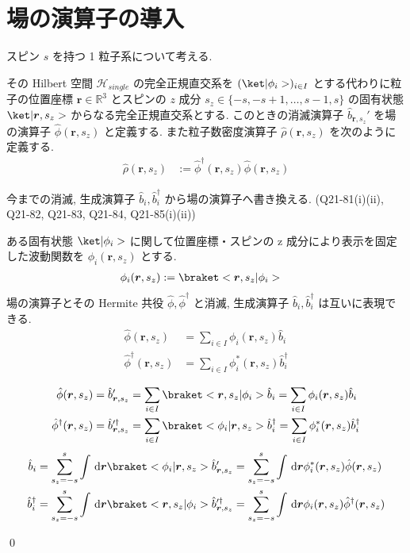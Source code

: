 \documentclass[uplatex,dvipdfmx,a4paper,11pt]{jlreq}
\makeatletter
\newcommand{\RR}{\mathbb{R}}
\newcommand{\HH}{\mathcal{H}}
\newcommand{\rr}{\bm{r}}
\numberwithin{equation}{section}
\theoremstyle{definition}
\renewenvironment{proof}[1][\proofname]{\par
  \normalfont
  \topsep6\p@\@plus6\p@ \trivlist
  \item[\hskip\labelsep{\bfseries #1}\@addpunct{\bfseries}]\ignorespaces\quad\par
}{
  \qed\endtrivlist\@endpefalse
}
\renewcommand\proofname{証明}
\makeatother
\begin{document}
\section{場の演算子の導入}
\begin{definition}[場の演算子]
  スピン $s$ を持つ 1 粒子系について考える.

  その Hilbert 空間 $\HH_{single}$ の完全正規直交系を $(\ket|\phi_i>)_{i\in I}$ とする代わりに粒子の位置座標 $\rr\in\RR^3$ とスピンの $z$ 成分 $s_z\in\{-s,-s+1,\ldots,s-1,s\}$ の固有状態 $\ket|\rr, s_z>$ からなる完全正規直交系とする.
  このときの消滅演算子 $\hat{b}_{\rr,s_z}'$ を場の演算子 $\hat{\phi}(\rr, s_z)$ と定義する.
  また粒子数密度演算子 $\hat{\rho}(\rr, s_z)$ を次のように定義する.
  \begin{align}
    \hat{\rho}(\rr, s_z) & := \hat{\phi}^\dagger(\rr, s_z)\hat{\phi}(\rr, s_z)
  \end{align}
\end{definition}
今までの消滅, 生成演算子 $\hat{b}_i, \hat{b}_i^\dagger$ から場の演算子へ書き換える. (Q21-81(i)(ii), Q21-82, Q21-83, Q21-84, Q21-85(i)(ii))
\begin{theorem}
  ある固有状態 $\ket|\phi_i>$ に関して位置座標・スピンの z 成分により表示を固定した波動関数を $\phi_i(\rr, s_z)$ とする.
  \begin{align}
    \phi_i(\rr, s_z) & := \braket<\rr, s_z|\phi_i>
  \end{align}
  場の演算子とその Hermite 共役 $\hat{\phi}, \hat{\phi}^\dagger$ と消滅, 生成演算子 $\hat{b}_i, \hat{b}_i^\dagger$ は互いに表現できる.
  \begin{align}
    \hat{\phi}(\rr, s_z)         & = \sum_{i\in I}\phi_i(\rr, s_z)\hat{b}_i           \\
    \hat{\phi}^\dagger(\rr, s_z) & = \sum_{i\in I}\phi_i^*(\rr, s_z)\hat{b}_i^\dagger
  \end{align}
\end{theorem}
\begin{proof}
  \begin{align}
    \hat{\phi}(\rr, s_z)         & = \hat{b}_{\rr,s_z}' = \sum_{i\in I}\braket<\rr,s_z|\phi_i>\hat{b}_i = \sum_{i\in I}\phi_i(\rr, s_z)\hat{b}_i                                  \\
    \hat{\phi}^\dagger(\rr, s_z) & = \hat{b}_{\rr,s_z}^{\prime\dagger} = \sum_{i\in I}\braket<\phi_i|\rr,s_z>\hat{b}_i^\dagger = \sum_{i\in I}\phi_i^*(\rr, s_z)\hat{b}_i^\dagger
  \end{align}
  \begin{align}
    \hat{b}_i         & = \sum_{s_z = -s}^s\int\dl{\rr}\braket<\phi_i|\rr, s_z>\hat{b}_{\rr,s_z}' = \sum_{s_z = -s}^s\int\dl{\rr}\phi_i^*(\rr, s_z)\hat{\phi}(\rr, s_z)                      \\
    \hat{b}_i^\dagger & = \sum_{s_z = -s}^s\int\dl{\rr}\braket<\rr, s_z|\phi_i>\hat{b}_{\rr,s_z}^{\prime\dagger} = \sum_{s_z = -s}^s\int\dl{\rr}\phi_i(\rr, s_z)\hat{\phi}^\dagger(\rr, s_z)
  \end{align}
\end{proof}
\end{document}
